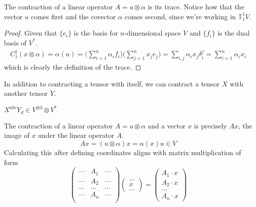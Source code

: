  \begin{proposition}
  The contraction of a linear operator $A = u \otimes \alpha$ is its trace. Notice how that the vector $u$ comes first and the covector $\alpha$ comes second, since we're working in $\mathbb{T}^1_1 V$. 
  \end{proposition}
  \begin{proof}
  Given that $\{e_i\}$ is the basis for $n$-dimensional space $V$ and $\{f_i\}$ is the dual basis of $V^*$.
  \begin{align*}
      C^1_1 (x \otimes \alpha) = \alpha (u) 
      = \Big( \sum_{i=1}^n \alpha_i f_i  \Big) \Big( \sum_{j=1}^n x_j e_j \Big)  = \sum_{i, j} \alpha_i x_j \delta^j_i = \sum_{i=1}^n \alpha_i x_i 
  \end{align*}
  which is clearly the definition of the trace. 
  \end{proof}

  In addition to contracting a tensor with itself, we can contract a tensor $X$ with another tensor $Y$. 

  \begin{example}
  $X^{a b c} Y_d \in V^{\otimes 3} \otimes V^*$ 
  \end{example}

  \begin{proposition}
  The contraction of a linear operator $A = u \otimes \alpha$ and a vector $x$ is precisely $A x$, the image of $x$ under the linear operator $A$. 
  \[A x = (u \otimes \alpha) x = \alpha (x) u \in V\]
  Calculating this after defining coordinates aligns with matrix multiplication of form
  \[\begin{pmatrix}
  \text{---} & A_1 & \text{---} \\
  \text{---} & A_2 & \text{---} \\
  ... & ... & ... \\
  \text{---} & A_n & \text{---} \\
  \end{pmatrix} \begin{pmatrix}
  ... \\ x \\ ... 
  \end{pmatrix} = \begin{pmatrix}
   A_1 \cdot x \\ A_2 \cdot x \\ ... \\ A_n \cdot x
  \end{pmatrix}\]
  \end{proposition}

